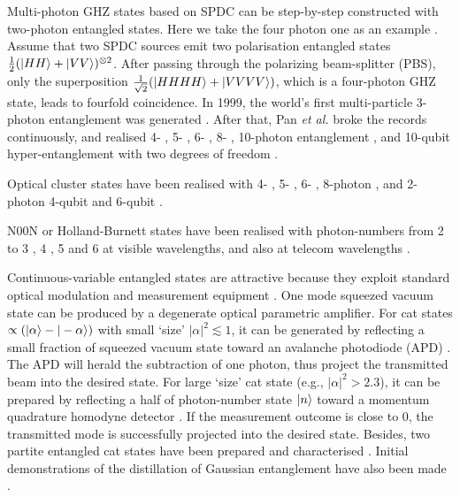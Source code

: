 
Multi-photon GHZ states based on SPDC \cite{bib:PhysRevLett.75.4337} can be step-by-step constructed with two-photon entangled states. Here we take the four photon one as an example \cite{bib:pan2012multiphoton}. Assume that two SPDC sources emit two polarisation entangled states \mbox{$\frac{1}{2}(|HH\rangle + |VV\rangle)^{\otimes 2}$}. After passing through the polarizing beam-splitter (PBS), only the superposition \mbox{$\frac{1}{\sqrt{2}}(|HHHH\rangle + |VVVV\rangle)$}, which is a four-photon GHZ state, leads to fourfold coincidence. In 1999, the world's first multi-particle 3-photon entanglement was generated \cite{bib:bouwmeester1999observation, bib:pan2000experimental}. After that, Pan \textit{et al.} broke the records continuously, and realised 4- \cite{bib:zhao2003experimental}, 5- \cite{bib:zhao2004experimental}, 6- \cite{bib:lu2007experimental}, 8- \cite{bib:yao2012observation}, 10-photon entanglement \cite{bib:tenPhotEnt}, and 10-qubit hyper-entanglement with two degrees of freedom \cite{bib:gao2010experimental}.

Optical cluster states have been realised with 4- \cite{bib:walther2005experimental}, 5- \cite{bib:lu2008experimental}, 6- \cite{bib:lu2007experimental}, 8-photon \cite{bib:yao2012experimental}, and 2-photon 4-qubit \cite{bib:chen2007experimental} and 6-qubit \cite{bib:ceccarelli2009experimental}.

N00N or Holland-Burnett states have been realised with photon-numbers from 2 \cite{bib:edamatsu2002measurement} to 3 \cite{bib:mitchell2004super}, 4 \cite{bib:walther2004broglie, bib:nagata2007beating, bib:matthews2011heralding}, 5 \cite{bib:afek2010high} and 6 \cite{bib:xiang2012optimal} at visible wavelengths, and also at telecom wavelengths \cite{bib:yabuno2012four, bib:bisht2015spectral, bib:jin2016detection}.

Continuous-variable entangled states are attractive because they exploit standard optical modulation and measurement equipment \cite{bib:ralph2009bright}. One mode squeezed vacuum state can be produced by a degenerate optical parametric amplifier. For cat states \mbox{$\propto(|\alpha\rangle - |-\alpha\rangle)$} with small `size' \mbox{$|\alpha|^2 \lesssim 1$}, it can be generated by reflecting a small fraction of squeezed vacuum state toward an avalanche photodiode (APD) \cite{bib:neergaard2006generation, bib:ourjoumtsev2006generating, bib:wakui2007photon}. The APD will herald the subtraction of one photon, thus project the transmitted beam into the desired state. For large `size' cat state (e.g., \mbox{$|\alpha|^2 > 2.3$}), it can be prepared by reflecting a half of photon-number state $|n\rangle$ toward a momentum quadrature homodyne detector \cite{bib:ourjoumtsev2007generation, bib:takahashi2008generation}. If the measurement outcome is close to 0, the transmitted mode is successfully projected into the desired state. Besides, two partite entangled cat states have been prepared and characterised \cite{bib:ourjoumtsev2009preparation}. Initial demonstrations of the distillation of Gaussian entanglement have also been made \cite{bib:takahashi2010entanglement, bib:xiang2010heralded}.

